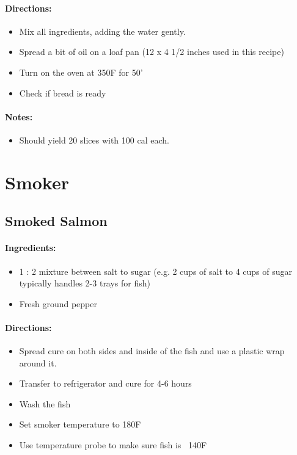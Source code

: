 \documentclass{article}
\begin{document}
\paragraph{Directions:}
\begin{itemize}
    \item Mix all ingredients, adding the water gently.
    \item Spread a bit of oil on a loaf pan (12 x 4 1/2 inches used in this recipe)
    \item Turn on the oven at 350F for 50'
    \item Check if bread is ready
\end{itemize}

\paragraph{Notes:}
\begin{itemize}
    \item Should yield 20 slices with 100 cal each.
\end{itemize}

\section{Smoker}


\subsection{Smoked Salmon}

\paragraph{Ingredients:}
\begin{itemize}
    \item 1 : 2 mixture between salt to sugar (e.g. 2 cups of salt to 4 cups of sugar typically handles 2-3 trays for fish)
    \item Fresh ground pepper
\end{itemize}

\paragraph{Directions:}
\begin{itemize}
    \item Spread cure on both sides and inside of the fish and use a plastic wrap around it.
    \item Transfer to refrigerator and cure for 4-6 hours
    \item Wash the fish
    \item Set smoker temperature to 180F
    \item Use temperature probe to make sure fish is ~140F
\end{itemize}
\end{document}
